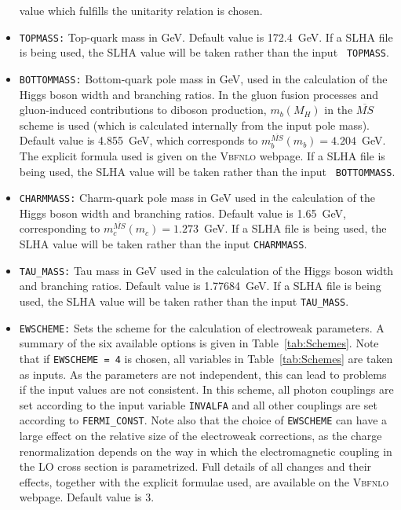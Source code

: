 \documentclass[english,12pt]{article}
\begin{document}
\begin{itemize}
value which fulfills the unitarity relation is chosen.
\item {\tt TOPMASS:} Top-quark mass in GeV. Default value is 172.4~GeV.  If a
SLHA file is being used, the SLHA value will be taken rather than the input {\tt
TOPMASS}.
\item {\tt BOTTOMMASS:} Bottom-quark pole mass in GeV, used in the calculation
of the Higgs boson width and branching ratios.  In the gluon fusion processes
and gluon-induced contributions to diboson production, $m_{b}(M_{H})$ in the $\overline{MS}$ scheme is used
(which is calculated internally from the input pole mass). Default value is
4.855~GeV, which corresponds to $m_{b}^{\overline{MS}}(m_{b}) = 4.204$~GeV.  The
explicit formula used is given on the \textsc{Vbfnlo} webpage.  If a SLHA file
is being used, the SLHA value will be taken rather than the input {\tt
BOTTOMMASS}.
\item {\tt CHARMMASS:} Charm-quark pole mass in GeV used in the calculation of
the Higgs boson width and branching ratios. Default value is 1.65~GeV,
corresponding to $m_{c}^{\overline{MS}}(m_{c}) = 1.273$~GeV.  If a SLHA file is
being used, the SLHA value will be taken rather than the input {\tt CHARMMASS}.
\item {\tt TAU\_MASS:} Tau mass in GeV used in the calculation of the Higgs boson
width and branching ratios. Default value is 1.77684~GeV.  If a SLHA file is
being used, the SLHA value will be taken rather than the input {\tt TAU\_MASS}.
\item {\tt EWSCHEME:} Sets the scheme for the calculation of electroweak
parameters. A summary of the six available options is given in
Table~\ref{tab:Schemes}. Note that if {\tt EWSCHEME = 4} is
chosen, all variables in Table~\ref{tab:Schemes} are taken as inputs.  As the
parameters are not independent, this can lead to problems if the input values
are not consistent.  In this scheme, all photon couplings are set according to
the input variable {\tt INVALFA} and all other couplings are set according to
{\tt FERMI\_CONST}.  Note also that the choice of {\tt EWSCHEME} can
have a large effect on the relative size of the electroweak corrections, as the
charge renormalization depends on the way in which the electromagnetic coupling 
in the LO cross section is parametrized. Full details of all
changes and their effects, together with the explicit formulae used, are
available on the \textsc{Vbfnlo} webpage. Default value is 3.
\begin{table}[t!]

\end{table}
\end{itemize}
\end{document}
